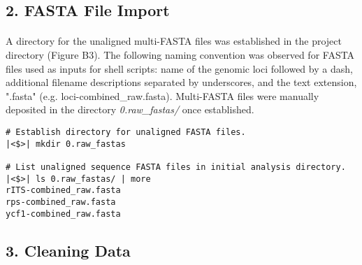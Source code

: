 \subsection*{2. FASTA File Import}

\paragraph{} A directory for the unaligned multi-FASTA files was established in the project directory (Figure B3).  The following naming convention was observed for FASTA files used as inputs for shell scripts: name of the genomic loci followed by a dash, additional filename descriptions separated by underscores, and the text extension, ".fasta" (e.g. loci-combined\_raw.fasta).  Multi-FASTA files were manually deposited in the directory \textit{0.raw\_fastas/} once established.

\clearpage

\begin{lstlisting}[caption={Unaligned sequence data deposited in \textit{0.raw\_fastas/} subdirectory.}]
# Establish directory for unaligned FASTA files.
|<$>| mkdir 0.raw_fastas

# List unaligned sequence FASTA files in initial analysis directory.
|<$>| ls 0.raw_fastas/ | more
rITS-combined_raw.fasta
rps-combined_raw.fasta
ycf1-combined_raw.fasta
\end{lstlisting}

\vspace*{36pt}

\subsection*{3. Cleaning Data}

